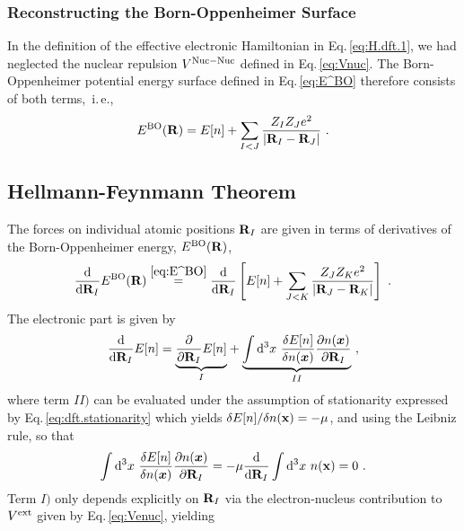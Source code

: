 \subsubsection{Reconstructing the Born-Oppenheimer Surface}
In the definition of the effective electronic Hamiltonian in Eq.\,\eqref{eq:H.dft.1}, we had neglected the nuclear repulsion $V^{\rm Nuc-Nuc}$ defined in Eq.\,\eqref{eq:Vnuc}. The Born-Oppenheimer potential energy surface defined in Eq.\,\eqref{eq:E^BO} therefore consists of both terms,~i.\,e.,
\begin{align}
	E^{\rm BO} ({\bf R}) 
		= E[n] + \sum_{I < J} \frac{Z_{I} Z_{J} e^{2}}{\left|{\bf R}_{I}-{\bf R}_{J}\right|}~.
	\label{eq:E^BO}
\end{align}

\subsection{Hellmann-Feynmann Theorem}
\label{sec:HellmannFeynman}
The forces on individual atomic positions ${\bf R}_I$ are given in terms of derivatives of the Born-Oppenheimer energy, $E^{\rm BO} ({\bf R})$,
\begin{align}
	\frac{{\rm d}}{{\rm d} {\bf R}_I} E^{\rm BO} ({\bf R})
		\stackrel{\eqref{eq:E^BO}}{=}
			\frac{{\rm d}}{{\rm d} {\bf R}_I } \left[
				E[n] + \sum_{J < K} \frac{Z_{J} Z_{K} e^{2}}{\left|{{\bf R}}_{J}-{\bf R}_{K}\right|}
			\right]
			~.
	\label{eq:hellmannfeynman.1}
\end{align}
The electronic part is given by
\begin{align}
		\frac{{\rm d}}{{\rm d} {\bf R}_I} E[n]
			= 
				\underset{I}{\underbrace{\frac{\partial}{\partial {\bf R}_I} E[n]}}
			+ \underset{II}{\underbrace{
					\int {\rm d}^{3} x ~ \frac{\delta E[n]}{\delta n(\boldsymbol{x})} \frac{\partial n(\boldsymbol{x})}{\partial {\bf R}_{I}}
				}}~,
		\label{eq:hellmannfeynman.2}
\end{align}
where term $II)$ can be evaluated under the assumption of stationarity expressed by Eq.\,\eqref{eq:dft.stationarity} which yields 
\mbox{$\delta E[n] / \delta n({\bf x}) = -\mu$},
and using the Leibniz rule, so that
\begin{align}
	\int {\rm d}^{3} x ~ \frac{\delta E[n]}{\delta n(\boldsymbol{x})} \frac{\partial n(\boldsymbol{x})}{\partial {\bf R}_{I}}
	= -\mu \frac{{\rm d}}{{\rm d} {\bf R}_I} \int {\rm d}^{3} x ~ n ({\bf x})
	= 0~.
	\label{eq:hellmannfeynman.3}
\end{align}
Term $I)$ only depends explicitly on ${\bf R}_I$ via the electron-nucleus contribution to $V^{\rm ext}$ given by Eq.\,\eqref{eq:Venuc}, yielding
